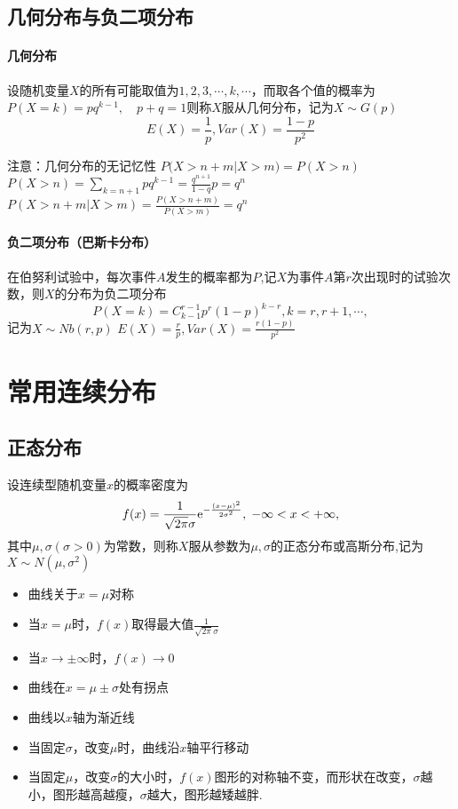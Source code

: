 \subsection{几何分布与负二项分布}
\paragraph{几何分布}
设随机变量$X$的所有可能取值为$1,2,3,\cdots,k,\cdots$，而取各个值的概率为$P(X = k) = pq^{k - 1},\quad p+q=1$则称$X$服从几何分布，记为$X \sim G(p)$
$$E(X) = \frac{1}{p},Var(X) = \frac{{1 - p}}{{{p^2}}}$$

注意：几何分布的无记忆性
$P(X > n + m\left| {X > m) = P(X > n)} \right.$
$P(X > n) = \sum\limits_{k = n + 1}^{} {p{q^{k - 1}}}  = \frac{{{q^{n + 1}}}}{{1 - q}}p = {q^n}$
$P(X > n + m\left| {X > m} \right.) = \frac{{P(X > n + m)}}{{P(X > m)}} = {q^n}$
\paragraph{负二项分布（巴斯卡分布）}
在伯努利试验中，每次事件$A$发生的概率都为$P$,记$X$为事件$A$第$r$次出现时的试验次数，则$X$的分布为负二项分布
$$P(X = k) = C_{k - 1}^{r - 1}{p^r}{(1 - p)^{k - r}},k = r,r + 1,\cdots,$$
记为$X \sim Nb(r,p)$
$E(X) = \frac{r}{p},Var(X) = \frac{{r(1 - p)}}{{{p^2}}}$
\section{常用连续分布}
\subsection{正态分布}
设连续型随机变量$x$的概率密度为
$$f(x) = \frac{1}{{\sqrt {2\pi } \sigma }}{{\rm{e}}^{ - \frac{{{{(x - \mu )}^2}}}{{2{\sigma ^2}}}}},\; - \infty  < x <  + \infty ,$$
其中$\mu,\sigma(\sigma > 0)$为常数，则称$X$服从参数为$\mu,\sigma$的正态分布或高斯分布,记为$X \sim N(\mu ,{\sigma ^2})$

\begin{itemize}
    \item 曲线关于$x=\mu$对称
    \item 当$x=\mu$时，$f(x)$取得最大值$\frac{1}{{\sqrt {2\pi } \sigma }}$
    \item 当$x \to  \pm \infty $时，$f(x) \to 0$
    \item 曲线在$x = \mu  \pm \sigma $处有拐点
    \item 曲线以$x$轴为渐近线
    \item 当固定$\sigma$，改变$\mu$时，曲线沿$x$轴平行移动
    \item 当固定$\mu$，改变$\sigma$的大小时，$f(x)$图形的对称轴不变，而形状在改变，$\sigma$越小，图形越高越瘦，$\sigma$越大，图形越矮越胖.
\end{itemize}

